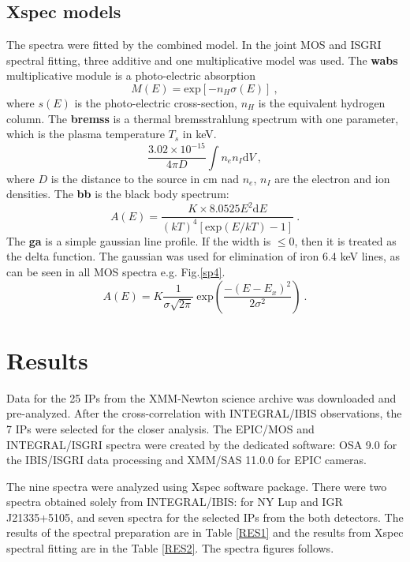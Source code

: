 \documentclass[oneside,a4paper,11pt]{report}
\begin{document}
\subsection{Xspec models}
The spectra were fitted by the combined model. In the joint MOS and ISGRI spectral fitting, three additive and one
multiplicative model was used. 
The \textbf{wabs} multiplicative module is a photo-electric absorption
\begin{equation}
\label{wabs}
 M(E)= \mathrm{exp}\left[ -n_H \sigma (E)\right]\:,
\end{equation}
where $s(E)$ is the photo-electric cross-section, $n_H$ is the equivalent hydrogen column.
The \textbf{bremss} is a thermal bremsstrahlung spectrum with one parameter, which is the plasma
temperature $T_s$ in keV.
\begin{equation}
 \label{brems}
\frac{3.02\times10^{-15}}{4\pi D} \int n_e n_I \mathrm{d}V\:,
\end{equation}
where $D$ is the distance to the source in cm nad $n_e$, $n_I$ are the electron and ion densities.    
The \textbf{bb} is the black body spectrum:
\begin{equation}
 \label{bb}
A(E) = \frac{K\times8.0525E^2 \mathrm{d} E }{(kT)^4 [\mathrm{exp}(E/kT)-1 ]}\:.
\end{equation}
The \textbf{ga} is a simple gaussian line profile. If the width is $\leq 0$, then it is treated as the 
delta function. The gaussian was used for elimination of iron 6.4 keV lines, as can be seen in all MOS spectra e.g. Fig.\ref{sp4}. 
\begin{equation}
 \label{gaus}
A(E) = K \frac{1}{\sigma \sqrt{2\pi}}\: \mathrm{exp}\left( \frac{-(E-E_x)^2}{2\sigma^2} \right)\:.
\end{equation}
 
\section{Results}
Data for the 25 IPs from the XMM-Newton science archive was downloaded and pre-analyzed. After the cross-correlation with INTEGRAL/IBIS observations, the 7 IPs 
were selected for the closer analysis. The EPIC/MOS and INTEGRAL/ISGRI spectra were created by the dedicated software: OSA 9.0 for the IBIS/ISGRI data 
processing and XMM/SAS 11.0.0 for EPIC cameras.

The nine spectra were analyzed using Xspec software package. There were two spectra obtained solely from INTEGRAL/IBIS: for NY Lup and IGR J21335+5105, and seven 
spectra for the selected IPs from the both detectors. The results of the spectral preparation are in Table \ref{RES1} and the results from Xspec 
spectral fitting are in the Table \ref{RES2}. The spectra figures follows.   
\end{document}
